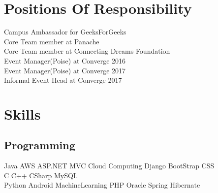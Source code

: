 \documentclass[]{deedy-resume-openfont}
\begin{document}
\begin{minipage}[t]{0.33\textwidth}

\section{Positions Of Responsibility}
\textbullet{} Campus Ambassador for GeeksForGeeks\\
\textbullet{} Core Team member at Panache\\
\textbullet{} Core Team member at Connecting Dreams Foundation\\
\textbullet{} Event Manager(Poise) at Converge 2016\\
\textbullet{} Event Manager(Poise) at Converge 2017\\
\textbullet{} Informal Event Head at Converge 2017\\


\section{Skills}
\subsection{Programming}
Java \textbullet{}   AWS \textbullet{} ASP.NET MVC\textbullet{} Cloud Computing \textbullet{}
Django \textbullet{} BootStrap \textbullet{} CSS \\ 
C \textbullet{} C++ \textbullet{} CSharp \textbullet{}  MySQL\\
Python \textbullet{} Android \textbullet{} MachineLearning \textbullet{} PHP  \textbullet{} Oracle
 \textbullet{} Spring Hibernate
\sectionsep

%
%

\end{minipage} 
\hfill
\end{document}
